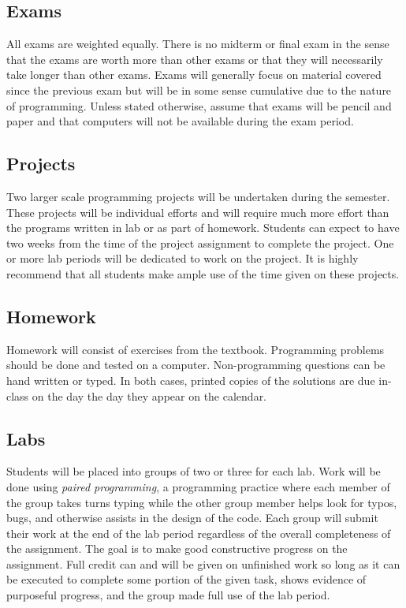 \documentclass[10pt]{article}
\begin{document}
\subsection*{Exams}

All exams are weighted equally. There is no midterm or final exam in the sense that the exams are worth more than other exams or that they will necessarily take longer than other exams.  Exams will generally focus on material covered since the previous exam but will be in some sense cumulative due to the nature of programming. Unless stated otherwise, assume that exams will be pencil and paper and that computers will not be available during the exam period.

\subsection*{Projects}

Two larger scale programming projects will be undertaken during the semester. These projects will be individual efforts and will require much more effort than the programs written in lab or as part of homework. Students can expect to have two weeks from the time of the project assignment to complete the project. One or more lab periods will be dedicated to work on the project. It is highly recommend that all students make ample use of the time given on these projects.

\subsection*{Homework}

Homework will consist of exercises from the textbook. Programming problems should be done and tested on a computer. Non-programming questions can be hand written or typed. In both cases, printed copies of the solutions are due in-class on the day the day they appear on the calendar.

\subsection*{Labs}

Students will be placed into groups of two or three for each lab. Work will be done using \textit{paired programming}, a programming practice where each member of the group takes turns typing while the other group member helps look for typos, bugs, and otherwise assists in the design of the code. Each group will submit their work at the end of the lab period regardless of the overall completeness of the assignment. The goal is to make good constructive progress on the assignment. Full credit can and will be given on unfinished work so long as it can be executed to complete some portion of the given task, shows evidence of purposeful progress, and the group made full use of the lab period.
\end{document}
